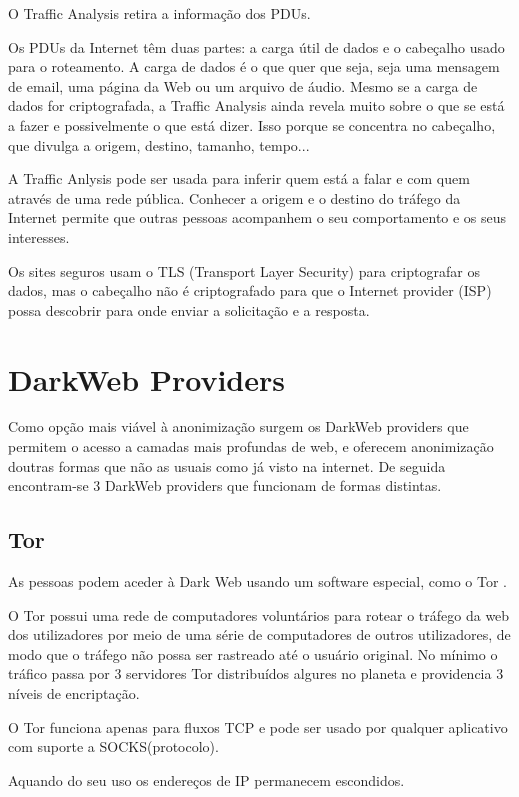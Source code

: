 \documentclass{llncs}
\begin{document}
O Traffic Analysis retira a informação dos PDUs.

Os PDUs da Internet têm duas partes: a carga útil de dados e o cabeçalho usado para o roteamento. A carga de dados é o que quer que seja, seja uma mensagem de email, uma página da Web ou um arquivo de áudio. Mesmo se a carga de dados for criptografada, a Traffic Analysis ainda revela muito sobre o que se está a fazer e possivelmente o que está dizer. Isso porque se concentra no cabeçalho, que divulga a origem, destino, tamanho, tempo... \cite{torweb}

A Traffic Anlysis pode ser usada para inferir quem está a falar e com quem através de uma rede pública. Conhecer a origem e o destino do tráfego da Internet permite que outras pessoas acompanhem o seu comportamento e os seus interesses.

Os sites seguros usam o TLS (Transport Layer Security) para criptografar os dados, mas o cabeçalho não é criptografado para que o Internet provider (ISP) possa descobrir para onde enviar a solicitação e a resposta. \cite{tord}

\section{DarkWeb Providers}

Como opção mais viável à anonimização surgem os DarkWeb providers que permitem o acesso a camadas mais profundas de web, e oferecem anonimização doutras formas que não as usuais como já visto na internet. De seguida encontram-se 3 DarkWeb providers que funcionam de formas distintas.

\subsection{Tor}

	As pessoas podem aceder à Dark Web usando um software especial, como o Tor .

O Tor possui uma rede de computadores voluntários para rotear o tráfego da web dos utilizadores por meio de uma série de computadores de outros utilizadores, de modo que o tráfego não possa ser rastreado até o usuário original. No mínimo o tráfico passa por 3 servidores Tor distribuídos algures no planeta e providencia 3 níveis de encriptação.

O Tor funciona apenas para fluxos TCP e pode ser usado por qualquer aplicativo com suporte a SOCKS(protocolo). \cite{torweb}

Aquando do seu uso os endereços de IP permanecem escondidos.
\end{document}
